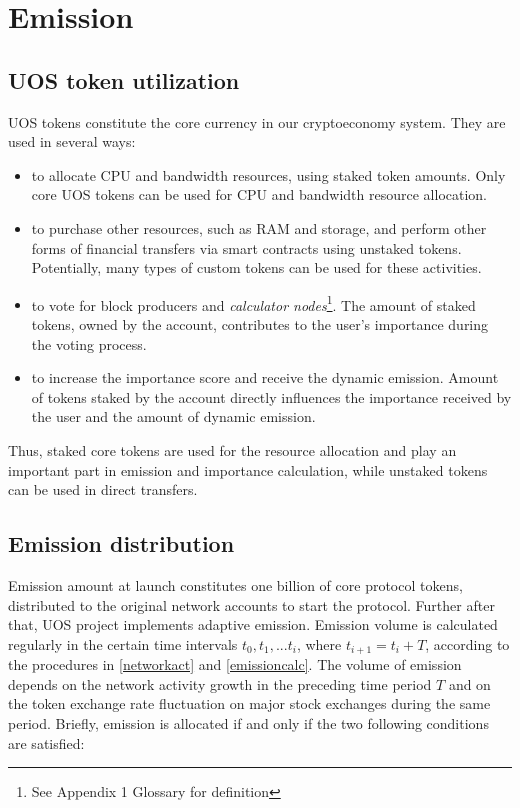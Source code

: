 \documentclass[a4paper,12pt]{article}
\begin{document}
\section{Emission}

\subsection{UOS token utilization}

UOS tokens constitute the core currency in our cryptoeconomy system. They are used in several ways:

\begin{itemize}
\item to allocate CPU and bandwidth resources, using staked token amounts. Only core UOS tokens can be used for CPU and bandwidth resource allocation.
\item to purchase other resources, such as RAM and storage, and perform other forms of financial transfers via smart contracts using unstaked tokens. Potentially, many types of custom tokens can be used for these activities.
\item to vote for block producers and \emph{calculator nodes}\footnote{See Appendix 1 Glossary for definition}. The amount of staked tokens, owned by the account, contributes to the user's importance during the voting process.
\item to increase the importance score and receive the dynamic emission. Amount of tokens staked by the account directly influences the importance received by the user and the amount of dynamic emission.
\end{itemize}

Thus, staked core tokens are used for the resource allocation and play an important part in emission and importance calculation, while unstaked tokens can be used in direct transfers. 

\subsection{Emission distribution}
Emission amount at launch constitutes one billion of core protocol tokens, distributed to the original network accounts to start the protocol. Further after that, U{\degree}OS project implements adaptive emission. Emission volume is calculated regularly in the certain time intervals $t_0, t_1, ... t_i$, where $t_{i+1} = t_i + T$, according to the procedures in \ref{networkact} and \ref{emissioncalc}. The volume of emission depends on the network activity growth in the preceding time period $T$ and on the token exchange rate fluctuation on major stock exchanges during the same period. Briefly, emission is allocated if and only if the two following conditions are satisfied:
\end{document}
